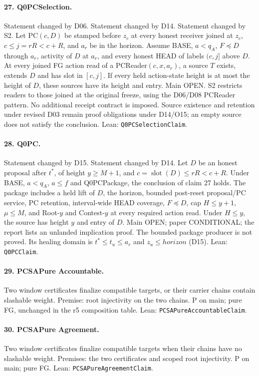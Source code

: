 \documentclass{article}
\newcommand{\slot}{\operatorname{slot}}
\newcommand{\nm}[1]{\nolinkurl{#1}}
\begin{document}
\paragraph{27. Q0PCSelection.}
Statement changed by D06. Statement changed by D14.
Statement changed by S2.
Let PC$(c,D)$ be stamped before $z_c$ at every honest receiver joined at $z_c$, $c\leq j=rR<c+R$, and $a_r$ be in the horizon. Assume BASE, $a<q_A$, $F\preceq D$ through $a_r$, activity of $D$ at $a_r$, and every honest HEAD of labels $(c,j]$ above $D$. At every joined FG action read of a PCReader$(c,x,a_r)$, a source $T$ exists, extends $D$ and has slot in $[c,j]$. If every held action-state height is at most the height of $D$, these sources have its height and entry. Main OPEN. S2 restricts readers to those joined at the original freeze, using the D06/D08 PCReader pattern. No additional receipt contract is imposed. Source existence and retention under revised D03 remain proof obligations under D14/O15; an empty source does not satisfy the conclusion.
Lean: \nm{Q0PCSelectionClaim}.

\paragraph{28. Q0PC.}
Statement changed by D15. Statement changed by D14.
Let $D$ be an honest proposal after $t^*$, of height $y\geq M+1$, and $c=\slot(D)\leq rR<c+R$. Under BASE, $a<q_A$, $a\leq f$ and Q0PCPackage, the conclusion of claim 27 holds. The package includes a held lift of $D$, the horizon, bounded post-reset proposal/PC service, PC retention, interval-wide HEAD coverage, $F\preceq D$, cap $H\leq y+1$, $\mu\leq M$, and Root-$y$ and Contest-$y$ at every required action read. Under $H\leq y$, the source has height $y$ and entry of $D$. Main OPEN; paper CONDITIONAL; the report lists an unlanded implication proof. The bounded package producer is not proved. Its healing domain is $t^*\leq t_u\leq a_r$ and $z_u\leq\mathit{horizon}$ (D15).
Lean: \nm{Q0PCClaim}.

\paragraph{29. PCSAPure Accountable.}
Two window certificates finalize compatible targets, or their carrier chains contain slashable weight. Premise: root injectivity on the two chains. P on main; pure FG, unchanged in the r5 composition table.
Lean: \nm{PCSAPureAccountableClaim}.

\paragraph{30. PCSAPure Agreement.}
Two window certificates finalize compatible targets when their chains have no slashable weight. Premises: the two certificates and scoped root injectivity. P on main; pure FG.
Lean: \nm{PCSAPureAgreementClaim}.
\end{document}
